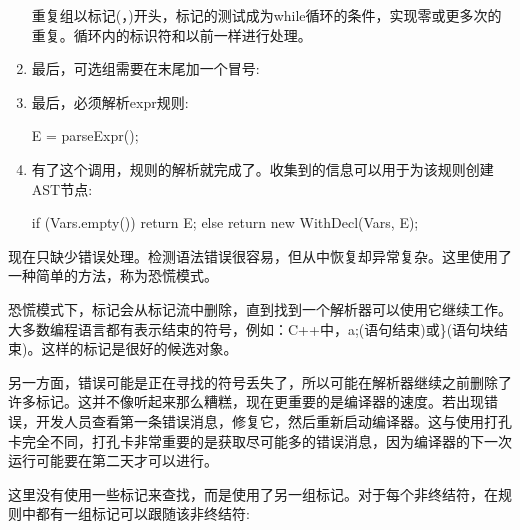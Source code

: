 \begin{enumerate}
重复组以标记(，)开头，标记的测试成为while循环的条件，实现零或更多次的重复。循环内的标识符和以前一样进行处理。

\item
最后，可选组需要在末尾加一个冒号:

\begin{cpp}
    if (consume(Token::colon))
        goto _error;
}
\end{cpp}

\item
最后，必须解析expr规则:

\begin{cpp}
    E = parseExpr();
\end{cpp}

\item
有了这个调用，规则的解析就完成了。收集到的信息可以用于为该规则创建AST节点:

\begin{cpp}
    if (Vars.empty()) return E;
    else return new WithDecl(Vars, E);
\end{cpp}
\end{enumerate}

现在只缺少错误处理。检测语法错误很容易，但从中恢复却异常复杂。这里使用了一种简单的方法，称为恐慌模式。

恐慌模式下，标记会从标记流中删除，直到找到一个解析器可以使用它继续工作。大多数编程语言都有表示结束的符号，例如：C++中，a;(语句结束)或\}(语句块结束)。这样的标记是很好的候选对象。

另一方面，错误可能是正在寻找的符号丢失了，所以可能在解析器继续之前删除了许多标记。这并不像听起来那么糟糕，现在更重要的是编译器的速度。若出现错误，开发人员查看第一条错误消息，修复它，然后重新启动编译器。这与使用打孔卡完全不同，打孔卡非常重要的是获取尽可能多的错误消息，因为编译器的下一次运行可能要在第二天才可以进行。


这里没有使用一些标记来查找，而是使用了另一组标记。对于每个非终结符，在规则中都有一组标记可以跟随该非终结符:


